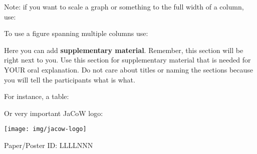 \documentclass[a0paper,fleqn]{betterposter}
\newcommand{\fontsizecaption}{\fontsize{32.00}{45.33} \selectfont}
\begin{document}
{\vspace*{3.0em}

Note: if you want to scale a graph or something to the full width of a column, use:

\vspace*{1.0em}


To use a figure spanning multiple columns use:


}{

Here you can add \textbf{supplementary material}. Remember, this section will be
right next to you.
Use this section for supplementary material that is needed for YOUR oral
explanation. Do not care about titles or naming the sections because you will
tell the participants what is what.

\vspace*{1.0em}

For instance, a table:


\vspace*{1.0em}

Or very important JaCoW logo:
\begin{center}
\texttt{[image: img/jacow-logo]}
\end{center}

\vspace*{14.0em}

\begin{flushright}
{\fontsizecaption Paper/Poster ID: LLLLNNN}
\end{flushright}

}
\end{document}

